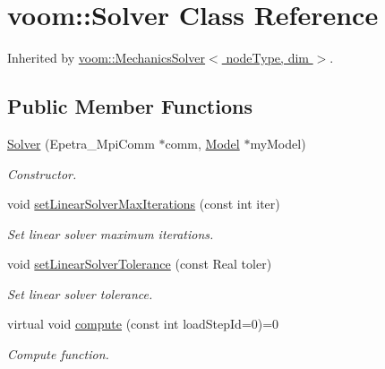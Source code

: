 \hypertarget{classvoom_1_1_solver}{
\section{voom::Solver Class Reference}
\label{classvoom_1_1_solver}
}


Inherited by \hyperlink{classvoom_1_1_mechanics_solver}{voom::MechanicsSolver$<$ nodeType, dim $>$}.\subsection*{Public Member Functions}
\begin{DoxyCompactItemize}
\item 
\hypertarget{classvoom_1_1_solver_a3ce583fb0f21f2c09cf2a7157f283d36}{
\hyperlink{classvoom_1_1_solver_a3ce583fb0f21f2c09cf2a7157f283d36}{Solver} (Epetra\_\-MpiComm $\ast$comm, \hyperlink{classvoom_1_1_model}{Model} $\ast$myModel)}
\label{classvoom_1_1_solver_a3ce583fb0f21f2c09cf2a7157f283d36}

\begin{DoxyCompactList}\small\item\em Constructor. \item\end{DoxyCompactList}\item 
\hypertarget{classvoom_1_1_solver_ada13f4ba3d6a8633878558eadfe70203}{
void \hyperlink{classvoom_1_1_solver_ada13f4ba3d6a8633878558eadfe70203}{setLinearSolverMaxIterations} (const int iter)}
\label{classvoom_1_1_solver_ada13f4ba3d6a8633878558eadfe70203}

\begin{DoxyCompactList}\small\item\em Set linear solver maximum iterations. \item\end{DoxyCompactList}\item 
\hypertarget{classvoom_1_1_solver_a94c8f0db9520a61ec16888e1266b3e96}{
void \hyperlink{classvoom_1_1_solver_a94c8f0db9520a61ec16888e1266b3e96}{setLinearSolverTolerance} (const Real toler)}
\label{classvoom_1_1_solver_a94c8f0db9520a61ec16888e1266b3e96}

\begin{DoxyCompactList}\small\item\em Set linear solver tolerance. \item\end{DoxyCompactList}\item 
\hypertarget{classvoom_1_1_solver_ad8e499c8c69ed766324dde1ed2e55993}{
virtual void \hyperlink{classvoom_1_1_solver_ad8e499c8c69ed766324dde1ed2e55993}{compute} (const int loadStepId=0)=0}
\label{classvoom_1_1_solver_ad8e499c8c69ed766324dde1ed2e55993}

\begin{DoxyCompactList}\small\item\em Compute function. \item\end{DoxyCompactList}\end{DoxyCompactItemize}

